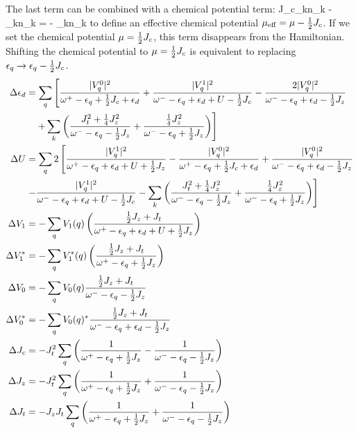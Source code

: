 \documentclass[14pt]{extarticle}
\numberwithin{equation}{section}
\begin{document}
{\eeq
The last term can be combined with a chemical potential term:
\beq
{}J_c\sum_{k\sigma\beta}\hat n_{k\sigma} - \mu \sum_{k\sigma}\hat n_{k\sigma} = - \sum_{k\sigma}\hat n_{k\sigma}
\eeq
to define an effective chemical potential \(\mu_\text{eff} = \mu - \frac{1}{2} J_c\). If we set the chemical potential \(\mu = \frac{1}{2} J_c\), this term disappears from the Hamiltonian. Shifting the chemical potential to \(\mu = \frac{1}{2} J_c\) is equivalent to replacing \(\epsilon_q \to \epsilon_q - \frac{1}{2} J_c\).
\begin{align*}
\Delta \epsilon_d &= \sum_q \left[\frac{|V_q^0|^2}{\omega^+ - \epsilon_q + \frac{1}{2} J_c + \epsilon_d } + \frac{|V_q^1|^2}{\omega^- - \epsilon_q + \epsilon_d  + U - \frac{1}{2} J_c} - \frac{2|V_q^0|^2}{\omega^- - \epsilon_q + \epsilon_d - \frac{1}{2} J_z} \right.\\
			  &\quad\left.+ \sum_{k}\left({\frac{J_t^2 + \frac{1}{4} J_z^2}{\omega^- - \epsilon_q - \frac{1}{2} J_z} + \frac{\frac{1}{4}J_z^2}{\omega^- - \epsilon_q + \frac{1}{2} J_z}}\right)\right]\\
\Delta U &= \sum_q 2\left[\frac{|V_q^1|^2}{\omega^+ - \epsilon_q + \epsilon_d + U + \frac{1}{2} J_z} - \frac{|V_q^0|^2}{\omega^+ - \epsilon_q + \frac{1}{2} J_c + \epsilon_d} + \frac{|V_q^0|^2}{\omega^- - \epsilon_q + \epsilon_d  - \frac{1}{2} J_z} \right.\\
		 &\left. - \frac{|V_q^1|^2}{\omega^- - \epsilon_q + \epsilon_d + U - \frac{1}{2} J_c} - \sum_{k}\left({\frac{J_t^2 + \frac{1}{4} J_z^2}{\omega^- - \epsilon_q - \frac{1}{2} J_z} + \frac{\frac{1}{4}J_z^2}{\omega^- - \epsilon_q + \frac{1}{2} J_z}}\right)\right]\\
\Delta V_1 &= -\sum_q V_1(q)\left({\frac{\frac{1}{2} J_z + J_t}{\omega^+ - \epsilon_q +\epsilon_d + U + \frac{1}{2} J_z}}\right)\\
\Delta V_1^* &= -\sum_q V_1^*(q)\left({\frac{\frac{1}{2} J_z + J_t}{\omega^+ - \epsilon_q + \frac{1}{2} J_z}}\right)\\
\Delta V_0 &= -\sum_q V_0(q)\frac{\frac{1}{2} J_z + J_t}{\omega^- - \epsilon_q  - \frac{1}{2} J_z}\\
\Delta V_0^* &= -\sum_q V_0(q)^*\frac{\frac{1}{2} J_z + J_t}{\omega^- - \epsilon_q + \epsilon_d - \frac{1}{2} J_z}\\
\Delta J_c &= -J_t^2 \sum_q \left({\frac{1}{\omega^+ - \epsilon_q  + \frac{1}{2}  J_z} - \frac{1}{\omega^- - \epsilon_q  - \frac{1}{2}  J_z}}\right)\\
\Delta J_z &= -J_t^2 \sum_q \left({\frac{1}{\omega^+ - \epsilon_q  + \frac{1}{2}  J_z} + \frac{1}{\omega^- - \epsilon_q  - \frac{1}{2} J_z}}\right)\\
\Delta J_t &= -  J_z J_t \sum_q \left({\frac{1}{\omega^+ - \epsilon_q  + \frac{1}{2} J_z} + \frac{1}{\omega^- - \epsilon_q  - \frac{1}{2} J_z}}\right)
\end{align*}
}
\end{document}
